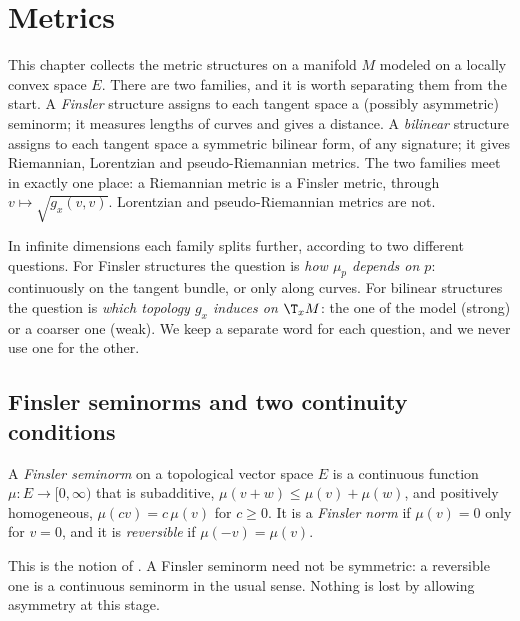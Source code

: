 \chapter{Metrics}
\label{chap:metrics}

This chapter collects the metric structures on a manifold $M$ modeled on a locally convex space
$E$. There are two families, and it is worth separating them from the start. A \emph{Finsler}
structure assigns to each tangent space a (possibly asymmetric) seminorm; it measures lengths of
curves and gives a distance. A \emph{bilinear} structure assigns to each tangent space a symmetric
bilinear form, of any signature; it gives Riemannian, Lorentzian and pseudo-Riemannian metrics.
The two families meet in exactly one place: a Riemannian metric is a Finsler metric, through
$v \mapsto \sqrt{g_x(v,v)}$. Lorentzian and pseudo-Riemannian metrics are not.

In infinite dimensions each family splits further, according to two different questions. For
Finsler structures the question is \emph{how $\mu_p$ depends on $p$}: continuously on the tangent
bundle, or only along curves. For bilinear structures the question is \emph{which topology $g_x$
induces on $\T_x M$}: the one of the model (strong) or a coarser one (weak). We keep a separate
word for each question, and we never use one for the other.


\section{Finsler seminorms and two continuity conditions}

\begin{definition}
  \label{def:finsler-seminorm}
  \leanok
  A \emph{Finsler seminorm} on a topological vector space $E$ is a continuous function
  $\mu \colon E \to [0, \infty)$ that is subadditive, $\mu(v + w) \le \mu(v) + \mu(w)$, and
  positively homogeneous, $\mu(c v) = c\,\mu(v)$ for $c \ge 0$. It is a \emph{Finsler norm} if
  $\mu(v) = 0$ only for $v = 0$, and it is \emph{reversible} if $\mu(-v) = \mu(v)$.
\end{definition}

This is the notion of \cite[Def.~2.2]{Lar19}. A Finsler seminorm need not be symmetric: a
reversible one is a continuous seminorm in the usual sense. Nothing is lost by allowing asymmetry
at this stage.

